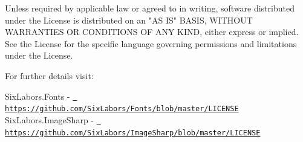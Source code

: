 Unless required by applicable law or agreed to in writing, software distributed under the License is distributed on an "{}\+AS IS"{} BASIS, WITHOUT WARRANTIES OR CONDITIONS OF ANY KIND, either express or implied. See the License for the specific language governing permissions and limitations under the License.

For further details visit\+:

Six\+Labors.\+Fonts -\/ \href{https://github.com/SixLabors/Fonts/blob/master/LICENSE}{\texttt{ https\+://github.\+com/\+Six\+Labors/\+Fonts/blob/master/\+LICENSE}} ~\newline
 Six\+Labors.\+Image\+Sharp -\/ \href{https://github.com/SixLabors/ImageSharp/blob/master/LICENSE}{\texttt{ https\+://github.\+com/\+Six\+Labors/\+Image\+Sharp/blob/master/\+LICENSE}} ~\newline
 